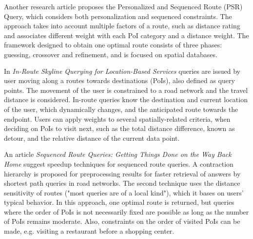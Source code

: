 Another research article proposes the Personalized and Sequenced Route (PSR) Query, which considers both personalization and sequenced constraints. The approach takes into account multiple factors of a route, such as distance rating and associates different weight with each PoI category and a distance weight. The framework designed to obtain one optimal route consists of three phases: guessing, crossover and refinement, and is focused on spatial databases. \cite{personalSRQ} 

In \textit{In-Route Skyline Querying for Location-Based Services} queries are issued by user moving along a routes towards destinations (PoIs), also defined as query points. The movement of the user is constrained to a road network and the travel distance is considered. In-route queries know the destination and current location of the user, which dynamically changes, and the anticipated route towards the endpoint. Users can apply weights to several spatially-related criteria, when deciding on PoIs to visit next, such as the total distance difference, known as detour, and the relative distance of the current data point. \cite{dynamicSRQ}

An article \textit{Sequenced Route Queries: Getting Things Done on the Way Back Home} suggest speedup techniques for sequenced route queries. A contraction hierarchy is proposed for preprocessing results for faster retrieval of answers by shortest path queries in road networks. The second technique uses the distance sensitivity of routes ("most queries are of a local kind"), which it bases on users' typical behavior. In this approach, one optimal route is returned, but queries where the order of PoIs is not necessarily fixed are possible as long as the number of PoIs remains moderate. Also, constraints on the order of visited PoIs can be made, e.g. visiting a restaurant before a shopping center. \cite{skyline}